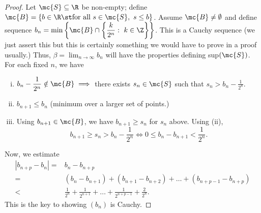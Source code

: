 \begin{proof}
	Let \(\mc{S}\subseteq\R\) be non-empty; define \(\mc{B}=\{b\in\R\st\text{for all}~s\in \mc{S},~s\leq b\}\). Assume \(\mc{B}\neq\emptyset\) and define sequence \(b_n=\operatorname{min}\left\{\mc{B}\cap\left\{\displaystyle\frac{k}{2^n}:~k\in\Z\right\}\right\}\).  This is a Cauchy sequence (we just assert this but this is certainly something we would have to prove in a proof usually.) Thus, \(\beta=\displaystyle\lim_{n\to\infty}b_n\) will have the properties defining sup\((\mc{S})\). For each fixed \(n\), we have 
	\begin{enumerate}[(i)]
		\item \(b_n-\displaystyle\frac{1}{2^n}\notin \mc{B}\implies\) there exists \(s_n\in \mc{S}\) such that \(s_n>b_n-\displaystyle\frac{1}{2^n}\).
		
		\item \(b_{n+1}\leq b_n\) (minimum over a larger set of points.)  
		
		\item Using \(b_{n+1}\in \mc{B}\), we have \(b_{n+1}\geq s_n\) for \(s_n\) above. Using (ii),
		\begin{equation*}
			b_{n+1}\geq s_n>b_n-\displaystyle\frac{1}{2^n}\iff 0\leq b_n-b_{n+1}<\displaystyle\frac{1}{2^n}.
		\end{equation*}
	\end{enumerate}
	Now, we estimate
	\begin{align*}
		|b_{n+p}-b_n|=&b_n-b_{n+p}\\
					 =&(b_n-b_{n+1})+(b_{n+1}-b_{n+2})+\dots+(b_{n+p-1}-b_{n+p})\\
					 <&\frac{1}{2^n}+\frac{1}{2^{n+1}}+\dots+\frac{1}{2^{n+p-1}}+\frac{2}{2^n}.
	\end{align*}
	This is the key to showing \((b_n)\) is Cauchy.
\end{proof}